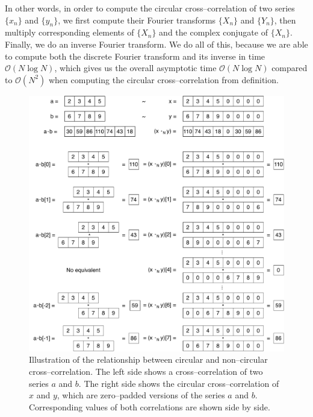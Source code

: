 In other words, in order to compute the circular cross--correlation of two series $\{x_n\}$ and $\{y_n\}$, we first compute their Fourier transforms $\{X_n\}$ and $\{Y_n\}$, then multiply corresponding elements of $\{X_n\}$ and the complex conjugate of $\{X_n\}$. Finally, we do an inverse Fourier transform. We do all of this, because we are able to compute both the discrete Fourier transform and its inverse in time $\mathcal{O}(N \log N)$, which gives us the overall asymptotic time $\mathcal{O}(N \log N)$ compared to $\mathcal{O}(N^2)$ when computing the circular cross--correlation from definition.


\begin{figure}
	\centering
	\includegraphics[width=\textwidth]{img/circ-cross-example}
	\caption{Illustration of the relationship between circular and non--circular cross--correlation. The left side shows a cross--correlation of two series $a$ and $b$. The right side shows the circular cross--correlation of $x$ and $y$, which are zero--padded versions of the series $a$ and $b$. Corresponding values of both correlations are shown side by side.}
	\label{circ-cross-example}
\end{figure}

